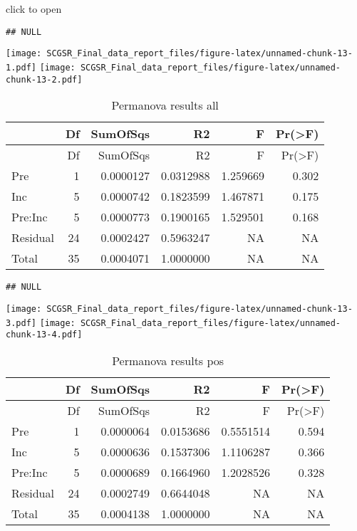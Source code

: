 \documentclass[
]{article}
\begin{document}
click to open

\begin{verbatim}
## NULL
\end{verbatim}

\texttt{[image: SCGSR\_Final\_data\_report\_files/figure-latex/unnamed-chunk-13-1.pdf]}
\texttt{[image: SCGSR\_Final\_data\_report\_files/figure-latex/unnamed-chunk-13-2.pdf]}

\begin{longtable}[]{@{}lrrrrr@{}}
\caption{Permanova results all}\tabularnewline
\toprule()
& Df & SumOfSqs & R2 & F & Pr(\textgreater F) \\
\midrule()
\endfirsthead
\toprule()
& Df & SumOfSqs & R2 & F & Pr(\textgreater F) \\
\midrule()
\endhead
Pre & 1 & 0.0000127 & 0.0312988 & 1.259669 & 0.302 \\
Inc & 5 & 0.0000742 & 0.1823599 & 1.467871 & 0.175 \\
Pre:Inc & 5 & 0.0000773 & 0.1900165 & 1.529501 & 0.168 \\
Residual & 24 & 0.0002427 & 0.5963247 & NA & NA \\
Total & 35 & 0.0004071 & 1.0000000 & NA & NA \\
\bottomrule()
\end{longtable}

\begin{verbatim}
## NULL
\end{verbatim}

\texttt{[image: SCGSR\_Final\_data\_report\_files/figure-latex/unnamed-chunk-13-3.pdf]}
\texttt{[image: SCGSR\_Final\_data\_report\_files/figure-latex/unnamed-chunk-13-4.pdf]}

\begin{longtable}[]{@{}lrrrrr@{}}
\caption{Permanova results pos}\tabularnewline
\toprule()
& Df & SumOfSqs & R2 & F & Pr(\textgreater F) \\
\midrule()
\endfirsthead
\toprule()
& Df & SumOfSqs & R2 & F & Pr(\textgreater F) \\
\midrule()
\endhead
Pre & 1 & 0.0000064 & 0.0153686 & 0.5551514 & 0.594 \\
Inc & 5 & 0.0000636 & 0.1537306 & 1.1106287 & 0.366 \\
Pre:Inc & 5 & 0.0000689 & 0.1664960 & 1.2028526 & 0.328 \\
Residual & 24 & 0.0002749 & 0.6644048 & NA & NA \\
Total & 35 & 0.0004138 & 1.0000000 & NA & NA \\
\bottomrule()
\end{longtable}
\end{document}
